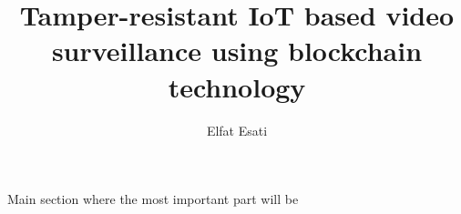 \documentclass[12pt,a4paper,english,twoside]{book}
\begin{document}

\author{Elfat Esati}
\title{Tamper-resistant IoT based video surveillance using blockchain technology}


\maketitle

\makeimprint





\tableofcontents

\cleardoublepage
{}




Main section where the most important part will be
%
%








\listoffigures
{}
\listoftables


\end{document}

